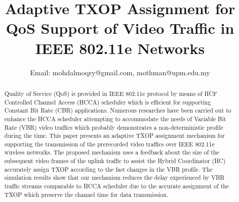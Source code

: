 \documentclass[a4paper, conference]{IEEEtran}
\begin{document}
\title{Adaptive TXOP Assignment for QoS Support of Video Traffic in IEEE 802.11e Networks}


\author{

Email: mohdalmoqry@gmail.com, mothman@upm.edu.my }


\maketitle

\begin{abstract}
Quality of Service (QoS) is provided in IEEE 802.11e protocol by means of HCF Controlled Channel Access (HCCA) scheduler which is efficient for supporting Constant Bit Rate (CBR) applications. Numerous researches have been carried out to enhance the HCCA scheduler attempting to accommodate the needs of Variable Bit Rate (VBR) video traffics which probably demonstrates a non-deterministic profile during the time. This paper presents an adaptive TXOP assignment mechanism for supporting the transmission of the prerecorded video traffics over IEEE 802.11e wireless networks. The proposed mechanism uses a feedback about the size of the subsequent video frames of the uplink traffic to assist the Hybrid Coordinator (HC) accurately assign TXOP according to the fast changes in the VBR profile. The simulation results show that our mechanism reduces the delay experienced by VBR traffic streams comparable to HCCA scheduler due to the accurate assignment of the TXOP which preserve the channel time for data transmission.
\end{abstract}


\IEEEpeerreviewmaketitle
\end{document}
